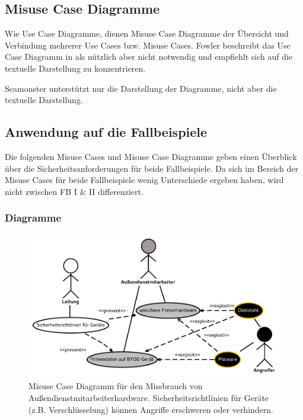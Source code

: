 \subsection{Misuse Case Diagramme}
Wie Use Case Diagramme, dienen Misuse Case Diagramme der Übersicht und Verbindung mehrerer Use Cases bzw. Misuse Cases. Fowler beschreibt das Use Case Diagramm in \cite{fowler2004uml} als nützlich aber nicht notwendig und empfiehlt sich auf die textuelle Darstellung zu konzentrieren. 

Seamonster unterstützt nur die Darstellung der Diagramme, nicht aber die textuelle Darstellung.

\subsection{Anwendung auf die Fallbeispiele}
Die folgenden Misuse Cases und Misuse Case Diagramme geben einen Überblick über die Sicherheitsanforderungen für beide Fallbeispiele. Da sich im Bereich der Misuse Cases für beide Fallbeispiele wenig Unterschiede ergeben haben, wird nicht zwischen FB I \& II differenziert.

\subsubsection{Diagramme}

\begin{figure}[h]
\includegraphics[scale=0.8]{images/Hardware.pdf} 
\caption{Misuse Case Diagramm für den Missbrauch von Außendienstmitarbeiterhardware. Sicherheitsrichtlinien für Geräte (z.B. Verschlüsselung) können Angriffe erschweren oder verhindern.}
\end{figure}

